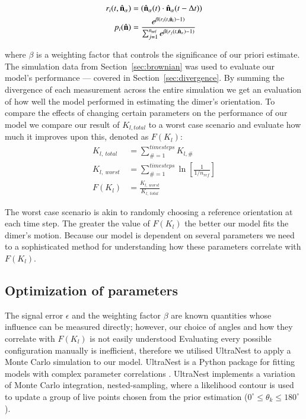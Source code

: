 \documentclass[final, 3p]{elsarticle}
\begin{document}
\begin{align}
  r_i(t, \hat{\bf n}_\alpha)
  &= (\hat{\bf n}_{\alpha}(t) \cdot \hat{\bf n}_\alpha(t-\Delta t))
  \\
  p_i(\hat{\bf n})
  &= \frac{e^{\beta (r_i(t,\hat{\bf n}_i)-1)}}
{\sum_{j=1}^{n_{\rm ref}}e^{\beta(r_j(t, \hat{\bf n}_\alpha)-1)}}
\end{align}

where $\beta$ is a weighting factor that controls the significance of our priori estimate. The simulation data from Section~\ref{sec:brownian} was used to evaluate our model's performance --- covered in Section~\ref{sec:divergence}. By summing the divergence of each measurement across the entire simulation we get an evaluation of how well the model performed in estimating the dimer's orientation. To compare the effects of changing certain parameters on the performance of our model we compare our result of $K_{l,total}$ to a worst case scenario and evaluate how much it improves upon this, denoted as $F(K_l)$:
\begin{align}
K_{l, \ total} &= \sum\limits_{\# =1}^{timesteps} K_{l,\#} \\
K_{l, \ worst} &= \sum\limits_{\#=1}^{timesteps} \ln \left[\frac{1}{1/n_{ref}} \right] \\
F(K_l) &= \frac{K_{l,\ worst}}{K_{l, \ total}}
\end{align}

The worst case scenario is akin to randomly choosing a reference orientation at each time step. The greater the value of $F(K_l)$ the better our model fits the dimer's motion. Because our model is dependent on several parameters we need to a sophisticated method for understanding how these parameters correlate with $F(K_l)$.


\subsection{Optimization of parameters}
\label{sec:ultranest}

The signal error $\epsilon$ and the weighting factor $\beta$ are known quantities whose influence can be measured directly; however, our choice of angles and how they correlate with $F(K_l)$ is not easily understood Evaluating every possible configuration manually is inefficient, therefore we utilised UltraNest to apply a Monte Carlo simulation to our model. UltraNest is a Python package for fitting models with complex parameter correlations \cite{Buchner2016Ultranest}. UltraNest implements a variation of Monte Carlo integration, nested-sampling, where a likelihood contour is used to update a group of live points chosen from the prior estimation ($0^{\circ} \leq \theta_k \leq 180^{\circ}$).
\end{document}
